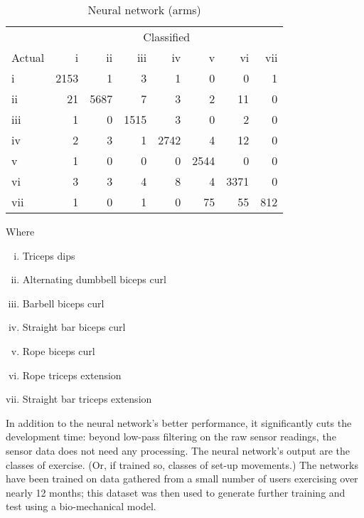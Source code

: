 \begin{table}[h]
    \begin{tabular}{lrrrrrrr}
        \toprule
        & \multicolumn{7}{c}{Classified} \\
        \cmidrule(r){2-8} Actual & i & ii & iii & iv & v & vi & vii \\
        \midrule
        i   & 2153 & 1    & 3    & 1    & 0     & 0    & 1   \\ 
        ii  & 21   & 5687 & 7    & 3    & 2     & 11   & 0   \\
        iii & 1    & 0    & 1515 & 3    & 0     & 2    & 0   \\
        iv  & 2    & 3    & 1    & 2742 & 4     & 12   & 0   \\
        v   & 1    & 0    & 0    & 0    & 2544  & 0    & 0   \\
        vi  & 3    & 3    & 4    & 8    & 4     & 3371 & 0   \\
        vii & 1    & 0    & 1    & 0    & 75    & 55   & 812 \\
        \bottomrule
    \end{tabular}
    Where 
    \begin{enumerate}[i.]
        \setlength\itemsep{0pt}
        \item Triceps dips
        \item Alternating dumbbell biceps curl
        \item Barbell biceps curl
        \item Straight bar biceps curl
        \item Rope biceps curl
        \item Rope triceps extension
        \item Straight bar triceps extension
    \end{enumerate}
    \caption{Neural network (arms)}
    \label{tbl:manual-features-mlp-arms}
\end{table}

In addition to the neural network's better performance, it significantly cuts the development time: beyond low-pass filtering on the raw sensor readings, the sensor data does not need any processing. The neural network's output are the classes of exercise. (Or, if trained so, classes of set-up movements.) The networks have been trained on data gathered from a small number of users exercising over nearly 12 months; this dataset was then used to generate further training and test using a bio-mechanical model.

